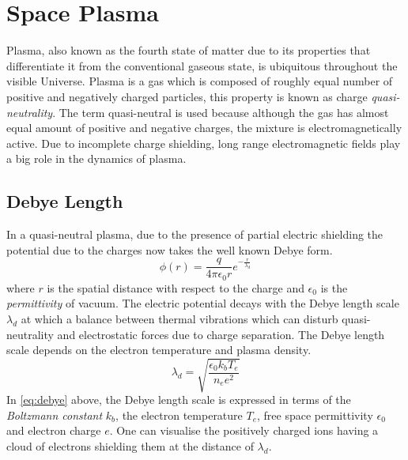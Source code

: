 \section{Space Plasma}\label{sec:plasma}

Plasma, also known as the fourth state of matter due to its properties that differentiate it from the 
conventional gaseous state, is ubiquitous throughout the visible Universe. Plasma is a gas which is 
composed of roughly equal number of positive and negatively charged particles, this property is known 
as charge \emph{quasi-neutrality}. The term quasi-neutral is used because although the gas has almost 
equal amount of positive and negative charges, the mixture is electromagnetically active. Due to incomplete 
charge shielding, long range electromagnetic fields play a big role in the dynamics of plasma.




\subsection*{Debye Length}

In a quasi-neutral plasma, due to the presence of partial electric shielding the potential due to the charges
now takes the well known Debye form.
%
\begin{equation}
    \phi(r) = \frac{q}{4\pi\epsilon_0 r} e^{-\frac{r}{\lambda_d}}
\end{equation}
%
where $r$ is the spatial distance with respect to the charge and $\epsilon_0$ is the \emph{permittivity} of vacuum.
The electric potential decays with the Debye length scale $\lambda_d$ at which a balance between thermal vibrations 
which can disturb quasi-neutrality and electrostatic forces due to charge separation. The Debye length scale depends
on the electron temperature and plasma density.
%
\begin{equation}\label{eq:debye}
    \lambda_d = \sqrt{\frac{\epsilon_0 k_b T_e}{n_e e^2}}
\end{equation}
%
In \cref{eq:debye} above, the Debye length scale is expressed in terms of the \emph{Boltzmann constant} $k_b$, 
the electron temperature $T_e$, free space permittivity $\epsilon_0$ and electron charge $e$. One can visualise the 
positively charged ions having a cloud of electrons shielding them at the distance of $\lambda_d$. 

